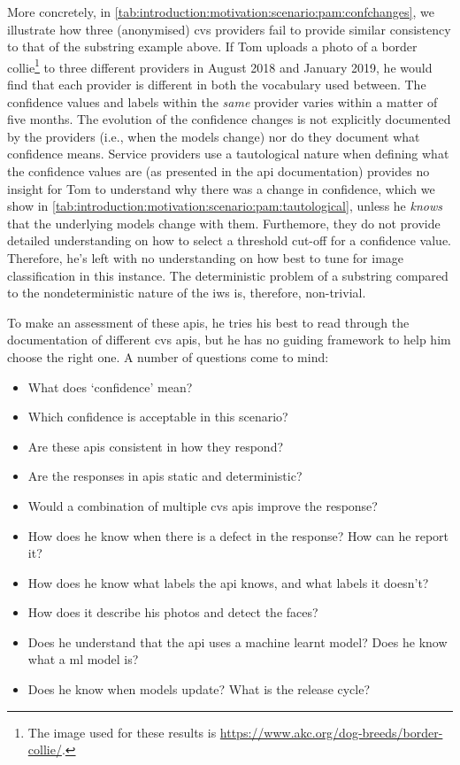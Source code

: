 More concretely, in \cref{tab:introduction:motivation:scenario:pam:confchanges}, we illustrate how three (anonymised) \gls{cvs} providers fail to provide similar consistency to that of the substring example above. If Tom uploads a photo of a border collie\footnote{The image used for these results is \url{https://www.akc.org/dog-breeds/border-collie/}.} to three different providers in August 2018 and January 2019, he would find that each provider is different in both the vocabulary used between. The confidence values and labels within the \textit{same} provider varies within a matter of five months. The evolution of the confidence changes is not explicitly documented by the providers (i.e., when the models change) nor do they document what confidence means. Service providers use a tautological nature when defining what the confidence values are (as presented in the \gls{api} documentation) provides no insight for Tom to understand why there was a change in confidence, which we show in \cref{tab:introduction:motivation:scenario:pam:tautological}, unless he \textit{knows} that the underlying models change with them. Furthemore, they do not provide detailed understanding on how to select a threshold cut-off for a confidence value. Therefore, he's left with no understanding on how best to tune for image classification in this instance. The deterministic problem of a substring compared to the nondeterministic nature of the \gls{iws} is, therefore, non-trivial.



To make an assessment of these \glspl{api}, he tries his best to read through the documentation of different \gls{cvs} \glspl{api}, but he has no guiding framework to help him choose the right one. A number of questions come to mind:

\begin{itemize}
  \item What does `confidence' mean?%
  \item Which confidence is acceptable in this scenario?%
  \item Are these \glspl{api} consistent in how they respond?%
  \item Are the responses in \glspl{api} static and deterministic?%
  \item Would a combination of multiple \gls{cvs} \glspl{api} improve the response?%
  \item How does he know when there is a defect in the response? How can he report it?%
  \item How does he know what labels the \gls{api} knows, and what labels it doesn't?%
  \item How does it describe his photos and detect the faces?%
  \item Does he understand that the \gls{api} uses a machine learnt model? Does he know what a \gls{ml} model is?%
  \item Does he know when models update? What is the release cycle?%
\end{itemize}


